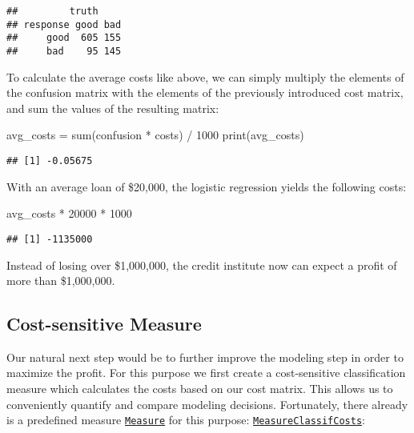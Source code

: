 \documentclass[
]{scrbook}
\newenvironment{Shaded}{\begin{snugshade}}{\end{snugshade}}
\newcommand{\DecValTok}[1]{\textcolor[rgb]{0.00,0.00,0.81}{#1}}
\newcommand{\FunctionTok}[1]{\textcolor[rgb]{0.00,0.00,0.00}{#1}}
\newcommand{\NormalTok}[1]{#1}
\newcommand{\OtherTok}[1]{\textcolor[rgb]{0.56,0.35,0.01}{#1}}
\newcommand{\SpecialCharTok}[1]{\textcolor[rgb]{0.00,0.00,0.00}{#1}}
\renewenvironment{Shaded} {\begin{snugshade}\small} {\end{snugshade}}
\begin{document}
\begin{verbatim}
##         truth
## response good bad
##     good  605 155
##     bad    95 145
\end{verbatim}

To calculate the average costs like above, we can simply multiply the elements of the confusion matrix with the elements of the previously introduced cost matrix, and sum the values of the resulting matrix:

\begin{Shaded}
\begin{Highlighting}[]
\NormalTok{avg\_costs }\OtherTok{=} \FunctionTok{sum}\NormalTok{(confusion }\SpecialCharTok{*}\NormalTok{ costs) }\SpecialCharTok{/} \DecValTok{1000}
\FunctionTok{print}\NormalTok{(avg\_costs)}
\end{Highlighting}
\end{Shaded}

\begin{verbatim}
## [1] -0.05675
\end{verbatim}

With an average loan of \$20,000, the logistic regression yields the following costs:

\begin{Shaded}
\begin{Highlighting}[]
\NormalTok{avg\_costs }\SpecialCharTok{*} \DecValTok{20000} \SpecialCharTok{*} \DecValTok{1000}
\end{Highlighting}
\end{Shaded}

\begin{verbatim}
## [1] -1135000
\end{verbatim}

Instead of losing over \$1,000,000, the credit institute now can expect a profit of more than \$1,000,000.

\hypertarget{cost-sensitive-measure}{%
\subsection{Cost-sensitive Measure}\label{cost-sensitive-measure}}

Our natural next step would be to further improve the modeling step in order to maximize the profit.
For this purpose we first create a cost-sensitive classification measure which calculates the costs based on our cost matrix.
This allows us to conveniently quantify and compare modeling decisions.
Fortunately, there already is a predefined measure \href{https://mlr3.mlr-org.com/reference/Measure.html}{\texttt{Measure}} for this purpose: \href{https://mlr3.mlr-org.com/reference/mlr_measures_classif.costs.html}{\texttt{MeasureClassifCosts}}:
\end{document}
